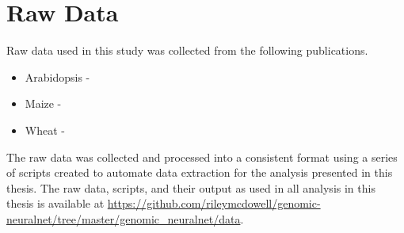 \chapter*{Raw Data}

Raw data used in this study was collected from the following publications.

\begin{itemize}
\item Arabidopsis -  \citet{loudet2002}
\item Maize - \citet{crossa2010}
\item Wheat - \citet{thavamanikumar2015}
\end{itemize}

The raw data was collected and processed into a consistent format using a series 
of scripts created to automate data extraction for the analysis presented in
this thesis. The raw data, scripts, and their output as used in all analysis 
in this thesis is available at 
\url{https://github.com/rileymcdowell/genomic-neuralnet/tree/master/genomic\_neuralnet/data}.

